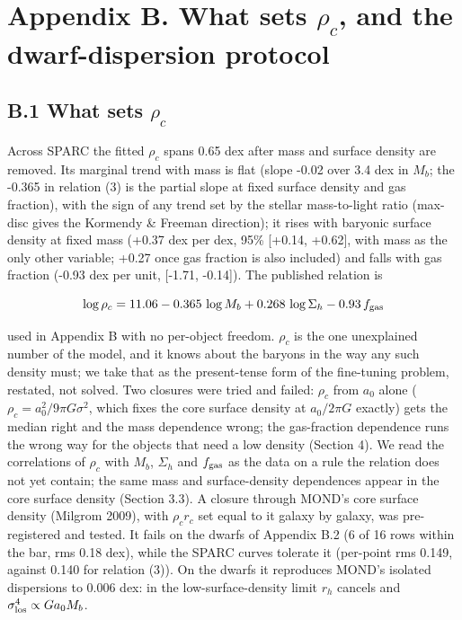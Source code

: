 \documentclass[
  10pt,
]{article}
\begin{document}
\section{Appendix B. What sets $\rho_c$, and the dwarf-dispersion protocol}\label{appendix-b.-what-sets-rho_c-and-the-dwarf-dispersion-protocol}

\subsection{B.1 What sets $\rho_c$}\label{what-sets-rho_c}

Across SPARC the fitted $\rho_c$ spans 0.65 dex after mass and surface
density are removed. Its marginal trend with mass is flat (slope -0.02
over 3.4 dex in $M_b$; the -0.365 in relation (3) is the partial slope at
fixed surface density and gas fraction), with the sign of any trend set
by the stellar mass-to-light ratio (max-disc gives the Kormendy \&
Freeman direction); it rises with baryonic surface density at fixed mass
(+0.37 dex per dex, 95\% {[}+0.14, +0.62{]}, with mass as the only other
variable; +0.27 once gas fraction is also included) and falls with gas
fraction (-0.93 dex per unit, {[}-1.71, -0.14{]}). The published
relation is

\begin{equation}
\log\rho_c = 11.06 - 0.365\,\log M_b + 0.268\,\log\Sigma_h - 0.93\,f_{\rm gas}
\end{equation}

used in Appendix B with no per-object freedom. $\rho_c$ is the one
unexplained number of the model, and it knows about the baryons in the way
any such density must; we take that as the present-tense form of the
fine-tuning problem, restated, not solved. Two closures were tried and
failed: $\rho_c$ from $a_0$ alone ($\rho_c=a_0^2/9\pi G\sigma^2$,
which fixes the core surface density at $a_0/2\pi G$ exactly) gets the
median right and the mass dependence wrong; the gas-fraction dependence
runs the wrong way for the objects that need a low density (Section 4).
We read the correlations of $\rho_c$ with $M_b$, $\Sigma_h$ and $f_{\rm gas}$ as the data on a rule the relation does not yet contain; the same mass and surface-density dependences appear in the core surface density (Section 3.3). A closure through MOND's core surface density (Milgrom 2009), with $\rho_c r_c$ set equal to it galaxy by galaxy, was pre-registered and tested. It fails on the dwarfs of Appendix B.2 (6 of 16 rows within the bar, rms 0.18 dex), while the SPARC curves tolerate it (per-point rms 0.149, against 0.140 for relation (3)). On the dwarfs it reproduces MOND's isolated dispersions to 0.006 dex: in the low-surface-density limit $r_h$ cancels and $\sigma_{\rm los}^4 \propto G a_0 M_b$.
\end{document}
